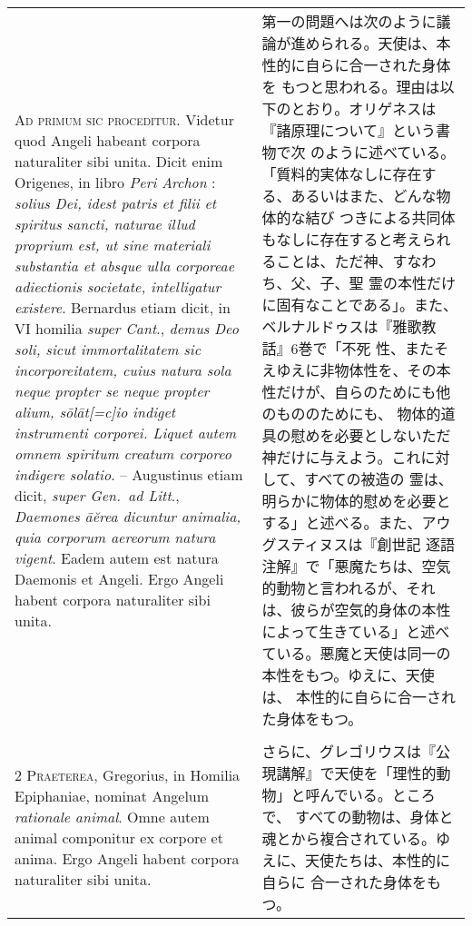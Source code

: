 \documentclass[10pt]{jsarticle} %
\begin{document}
\begin{longtable}{p{21em}p{21em}}

{\huge A}{\scshape d primum sic proceditur}. Videtur quod Angeli habeant corpora
naturaliter sibi unita. Dicit enim Origenes, in libro {\itshape Peri Archon} :
{\itshape solius Dei, idest patris et filii et spiritus sancti, naturae illud
proprium est, ut sine materiali substantia et absque ulla corporeae adiectionis
societate, intelligatur existere}. Bernardus etiam dicit, in VI homilia
{\itshape super Cant}., {\itshape demus Deo soli, sicut immortalitatem sic
incorporeitatem, cuius natura sola neque propter se neque propter alium,
s\={o}l\={a}t[=c]io indiget instrumenti corporei. Liquet autem omnem spiritum
creatum corporeo indigere solatio}. -- Augustinus etiam dicit, {\itshape super
Gen.~ad Litt}., {\itshape Daemones \={a}\u{e}rea dicuntur animalia, quia
corporum aereorum natura vigent}. Eadem autem est natura Daemonis et
Angeli. Ergo Angeli habent corpora naturaliter sibi unita.


&

第一の問題へは次のように議論が進められる。天使は、本性的に自らに合一された身体を
もつと思われる。理由は以下のとおり。オリゲネスは『諸原理について』という書物で次
のように述べている。「質料的実体なしに存在する、あるいはまた、どんな物体的な結び
つきによる共同体もなしに存在すると考えられることは、ただ神、すなわち、父、子、聖
霊の本性だけに固有なことである」。また、ベルナルドゥスは『雅歌教話』6巻で「不死
性、またそえゆえに非物体性を、その本性だけが、自らのためにも他のもののためにも、
物体的道具の慰めを必要としないただ神だけに与えよう。これに対して、すべての被造の
霊は、明らかに物体的慰めを必要とする」と述べる。また、アウグスティヌスは『創世記
逐語注解』で「悪魔たちは、空気的動物と言われるが、それは、彼らが空気的身体の本性
によって生きている」と述べている。悪魔と天使は同一の本性をもつ。ゆえに、天使は、
本性的に自らに合一された身体をもつ。

\\\\


{\scshape 2 Praeterea}, Gregorius, in Homilia Epiphaniae, nominat Angelum
{\itshape rationale animal}. Omne autem animal componitur ex corpore et
anima. Ergo Angeli habent corpora naturaliter sibi unita.


&

さらに、グレゴリウスは『公現講解』で天使を「理性的動物」と呼んでいる。ところで、
すべての動物は、身体と魂とから複合されている。ゆえに、天使たちは、本性的に自らに
合一された身体をもつ。



\end{longtable}
\end{document}
